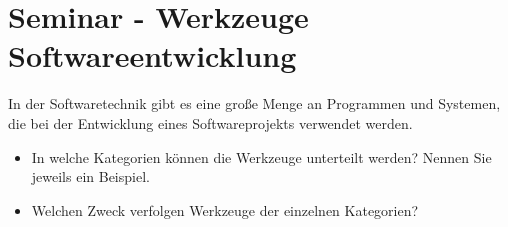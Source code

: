 	
\section{Seminar - Werkzeuge Softwareentwicklung}

	
	   \begin{aufgabe}
           In der Softwaretechnik gibt es eine große Menge an Programmen und Systemen, die bei der Entwicklung eines Softwareprojekts verwendet werden.
           \\[-.7cm]\begin{itemize}
               \setlength\itemsep{0.1px}
               \item In welche Kategorien können die Werkzeuge unterteilt werden? Nennen Sie jeweils
               ein Beispiel.
               \item Welchen Zweck verfolgen Werkzeuge der einzelnen Kategorien?
           \end{itemize}
       \end{aufgabe}
   
